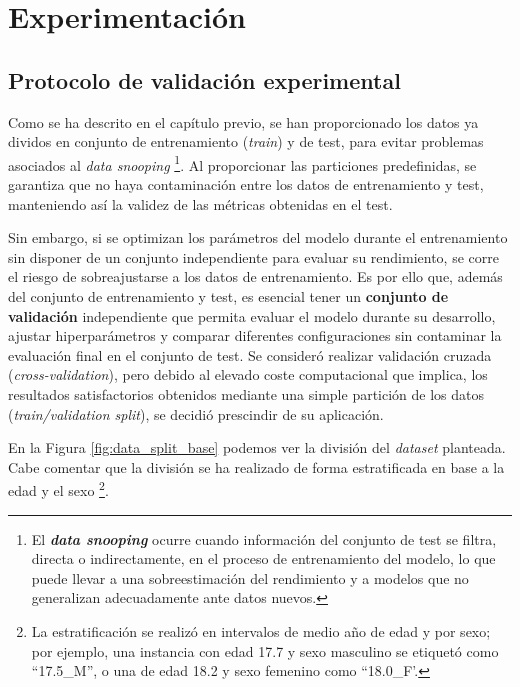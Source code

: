 \chapter{Experimentación}


\section{Protocolo de validación experimental}

Como se ha descrito en el capítulo previo, se han proporcionado los datos ya dividos en conjunto de entrenamiento (\textit{train}) y de test, para evitar problemas asociados al \textit{data snooping}%
\footnote{
    El \textbf{\textit{data snooping}} ocurre cuando información del conjunto de test se filtra, directa o indirectamente, en el proceso de entrenamiento del modelo, lo que puede llevar a una sobreestimación del rendimiento y a modelos que no generalizan adecuadamente ante datos nuevos.
}.
Al proporcionar las particiones predefinidas, se garantiza que no haya contaminación entre los datos de entrenamiento y test, manteniendo así la validez de las métricas obtenidas en el test. 

Sin embargo, si se optimizan los parámetros del modelo durante el entrenamiento sin disponer de un conjunto independiente para evaluar su rendimiento, se corre el riesgo de sobreajustarse a los datos de entrenamiento. Es por ello que, además del conjunto de entrenamiento y test, es esencial tener un \textbf{conjunto de validación} independiente que permita evaluar el modelo durante su desarrollo, ajustar hiperparámetros y comparar diferentes configuraciones sin contaminar la evaluación final en el conjunto de test. Se consideró realizar validación cruzada (\textit{cross-validation}), pero debido al elevado coste computacional que implica, los resultados satisfactorios obtenidos mediante una simple partición de los datos (\textit{train/validation split}), se decidió prescindir de su aplicación.

En la Figura \ref{fig:data_split_base} podemos ver la división del \textit{dataset} planteada. Cabe comentar que la división se ha realizado de forma estratificada en base a la edad y el sexo%
\footnote{
    La estratificación se realizó en intervalos de medio año de edad y por sexo; por ejemplo, una instancia con edad 17.7 y sexo masculino se etiquetó como ``17.5\_M'', o una de edad 18.2 y sexo femenino como ``18.0\_F'.
}.

